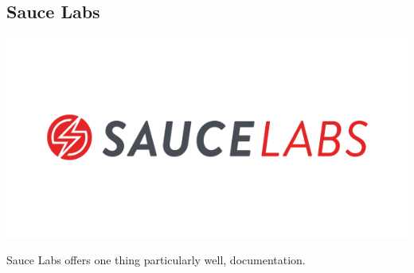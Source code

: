 \subsection{ Sauce Labs }
\includegraphics[scale=0.6]{pwa-toolset-sauce-labs/logo-sauce-labs}

Sauce Labs offers one thing particularly well, documentation.
